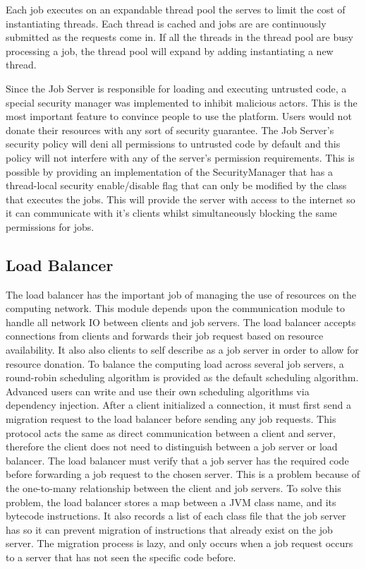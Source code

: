Each job executes on an expandable thread pool the serves to limit
the cost of instantiating threads. Each thread is cached and jobs
are are continuously submitted as the requests come in. If all the threads
in the thread pool are busy processing a job, the thread pool will
expand by adding instantiating a new thread.

Since the Job Server is responsible for loading and executing untrusted
code, a special security manager was implemented to inhibit malicious actors.
This is the most important feature to convince people to use the platform.
Users would not donate their resources with any sort of security guarantee.
The Job Server's security policy will deni all permissions to untrusted code
by default and this policy will not interfere with any of the server's
permission requirements. This is possible by providing an implementation
of the SecurityManager that has a thread-local security enable/disable flag
that can only be modified by the class that executes the jobs. This will provide
the server with access to the internet so it can communicate with it's clients
whilst simultaneously blocking the same permissions for jobs.

\subsection{Load Balancer}\label{subsec:modules}

The load balancer has the important job of managing the use of resources
on the computing network.
This module depends upon the communication module to handle all network IO
between clients and job servers.
The load balancer accepts connections from clients and forwards their job
request based on resource availability.
It also also clients to self describe as a job server in order to allow for
resource donation.
To balance the computing load across several job servers, a round-robin
scheduling algorithm is provided as the default scheduling algorithm.
Advanced users can write and use their own scheduling algorithms via dependency
injection.
After a client initialized a connection, it must first send a migration request
to the load balancer before sending any job requests.
This protocol acts the same as direct communication between a client and server,
therefore the client does not need to distinguish between a job server or load
balancer.
The load balancer must verify that a job server has the required
code before forwarding a job request to the chosen server.
This is a problem because of the one-to-many relationship between the client
and job servers.
To solve this problem, the load balancer stores a map between
a JVM class name, and its bytecode instructions.
It also records a list of each class file that the job server has so it can
prevent migration of instructions that already exist on the job server.
The migration process is lazy, and only occurs when a job request
occurs to a server that has not seen the specific code before.
